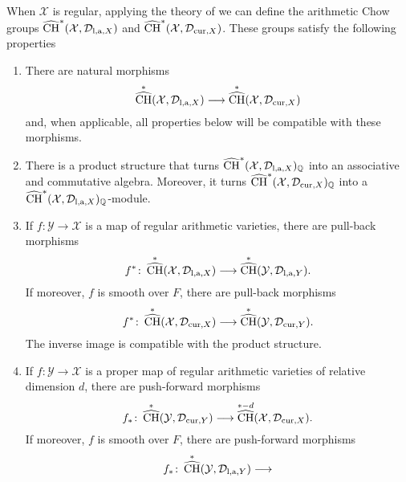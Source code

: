 \documentclass[10pt,twoside]{article}
\numberwithin{equation}{section}
\theoremstyle{plain}
\theoremstyle{definition}
\DeclareMathOperator{\cha}{\widehat{CH}}
\newcommand{\QQ}{{\mathbb Q}}
\newcommand{\las}{{\text{\rm l,a}}}
\newcommand{\D}{\text{{\rm cur}}}
\begin{document}
When $\mathcal{X}$ is regular, applying the theory of
\cite{BurgosKramerKuehn:cacg} we can define 
the arithmetic Chow groups
$\cha^{\ast}(\mathcal{X},\mathcal{D}_{\las,X})$ and
$\cha^{\ast}(\mathcal{X},\mathcal{D}_{\D,X})$. These groups satisfy
the following properties
\begin{enumerate}
\item There are natural morphisms
  \begin{displaymath}
    \cha^{\ast}(\mathcal{X},\mathcal{D}_{\las,X}) \longrightarrow 
    \cha^{\ast}(\mathcal{X},\mathcal{D}_{\D,X})
  \end{displaymath}
  and, when applicable, all properties below will be compatible with these
  morphisms.  

\item There is a product structure that turns
  $\cha^{\ast}(\mathcal{X},\mathcal{D}_{\las,X})_{\QQ}$ into an
  associative and commutative algebra. Moreover, it turns
  $\cha^{\ast}(\mathcal{X},\mathcal{D}_{\D,X})_{\QQ}$ into a 
  $\cha^{\ast}(\mathcal{X},\mathcal{D}_{\las,X})_{\QQ}$-module.
\item  If $f\colon \mathcal{Y}\longrightarrow \mathcal{X}$ is a map 
  of regular arithmetic varieties, there
  are pull-back morphisms  
  \begin{displaymath}
    f^{\ast}\colon \cha^{\ast}(\mathcal{X},\mathcal{D}_{\las,X})\longrightarrow 
    \cha^{\ast}(\mathcal{Y},\mathcal{D}_{\las,Y}).    
  \end{displaymath}
  If moreover, $f$ is smooth over $F$, there are pull-back morphisms 
  \begin{displaymath}
    f^{\ast}\colon \cha^{\ast}(\mathcal{X},\mathcal{D}_{\D,X})\longrightarrow 
    \cha^{\ast}(\mathcal{Y},\mathcal{D}_{\D,Y}).    
  \end{displaymath}
  The inverse image is compatible with the product structure.
\item  If $f\colon \mathcal{Y}\longrightarrow \mathcal{X}$ is a proper map  
  of regular arithmetic varieties of relative dimension $d$, there are
  push-forward morphisms 
  \begin{displaymath}
    f_{\ast}\colon \cha^{\ast}(\mathcal{Y},\mathcal{D}_{\D,Y})\longrightarrow 
    \cha^{\ast-d}(\mathcal{X},\mathcal{D}_{\D,X}).    
  \end{displaymath}
  If moreover, $f$ is smooth over $F$, there are push-forward  morphisms 
  \begin{displaymath}
    f_{\ast}\colon \cha^{\ast}(\mathcal{Y},\mathcal{D}_{\las,Y})\longrightarrow 

\end{displaymath}
\end{enumerate}
\end{document}
